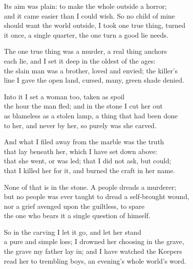 \begin{founder}
Its aim was plain: to make the whole outside a horror;\\
and it came easier than I could wish. So no child of mine\\
should want the world outside, I took one true thing, turned\\
it once, a single quarter, the one turn a good lie needs.\\
\medskip

The one true thing was a murder, a real thing anchors\\
each lie, and I set it deep in the oldest of the ages:\\
the slain man was a brother, loved and envied; the killer's\\
line I gave the open land, cursed, many, green shade denied.\\
\medskip

Into it I set a woman too, taken as spoil\\
the hour the man fled; and in the stone I cut her out\\
as blameless as a stolen lamp, a thing that had been done\\
to her, and never by her, so purely was she carved.\\
\medskip

And what I filed away from the marble was the truth\\
that lay beneath her, which I have set down above:\\
that she went, or was led; that I did not ask, but could;\\
that I killed her for it, and burned the craft in her name.\\
\medskip

None of that is in the stone. A people dreads a murderer;\\
but no people was ever taught to dread a self-brought wound,\\
nor a grief avenged upon the guiltless, to spare\\
the one who bears it a single question of himself.\\
\medskip

So in the carving I let it go, and let her stand\\
a pure and simple loss; I drowned her choosing in the grave,\\
the grave my father lay in; and I have watched the Keepers\\
read her to trembling boys, an evening's whole world's word.\\


\end{founder}
